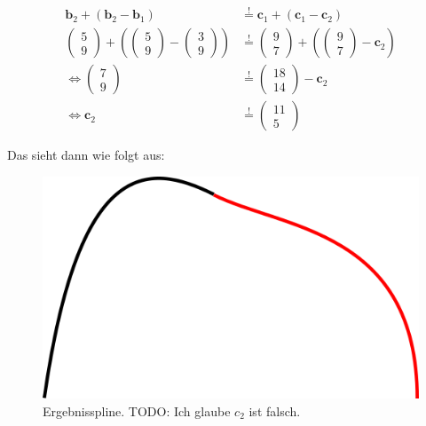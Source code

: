 \documentclass[a4paper]{scrartcl}
\begin{document}
\begin{align}
    \mathbf{b}_{2} + (\mathbf{b}_{2} - \mathbf{b}_{1}) &\overset{!}{=} \mathbf{c}_{1} + (\mathbf{c}_{1} - \mathbf{c}_{2})\\
    \begin{pmatrix}5\\9\end{pmatrix} + \left (\begin{pmatrix}5\\9\end{pmatrix} - \begin{pmatrix}3\\9\end{pmatrix} \right )
    &\overset{!}{=}
    \begin{pmatrix}9\\7\end{pmatrix} + \left (\begin{pmatrix}9\\7\end{pmatrix} - \mathbf{c}_{2} \right)\\
    \Leftrightarrow \begin{pmatrix}7\\9\end{pmatrix} &\overset{!}{=} \begin{pmatrix}18\\14\end{pmatrix} - \mathbf{c}_{2}\\
    \Leftrightarrow \mathbf{c}_{2} &\overset{!}{=} \begin{pmatrix}11\\5\end{pmatrix}
\end{align}

Das sieht dann wie folgt aus:

\begin{figure}[h]
    \centering
    \includegraphics*[width=0.5\linewidth, keepaspectratio]{11a.png}
    \caption{Ergebnisspline. TODO: Ich glaube $c_2$ ist falsch.}
    \label{fig:situation-11a}
\end{figure}
\clearpage
\end{document}
